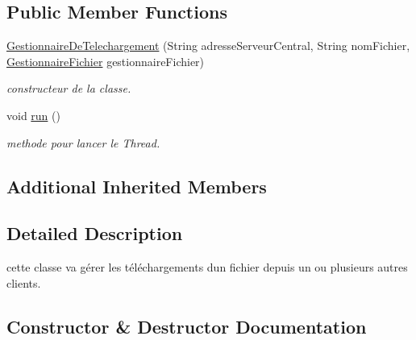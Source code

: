 \subsection*{Public Member Functions}
\begin{DoxyCompactItemize}
\item 
\hyperlink{classgestionnaireRequete_1_1GestionnaireDeTelechargement_a254be2581dcadd4e17265b9460d4b229}{Gestionnaire\+De\+Telechargement} (String adresse\+Serveur\+Central, String nom\+Fichier, \hyperlink{classterminalClient_1_1GestionnaireFichier}{Gestionnaire\+Fichier} gestionnaire\+Fichier)
\begin{DoxyCompactList}\small\item\em constructeur de la classe. \end{DoxyCompactList}\item 
\mbox{\label{classgestionnaireRequete_1_1GestionnaireDeTelechargement_ad501981a3f10e907c9466042ce2bc72f}} 
void \hyperlink{classgestionnaireRequete_1_1GestionnaireDeTelechargement_ad501981a3f10e907c9466042ce2bc72f}{run} ()
\begin{DoxyCompactList}\small\item\em methode pour lancer le Thread. \end{DoxyCompactList}\end{DoxyCompactItemize}
\subsection*{Additional Inherited Members}


\subsection{Detailed Description}
cette classe va gérer les téléchargements d\textquotesingle{}un fichier depuis un ou plusieurs autres clients. 

\subsection{Constructor \& Destructor Documentation}
\mbox{\label{classgestionnaireRequete_1_1GestionnaireDeTelechargement_a254be2581dcadd4e17265b9460d4b229}} 
